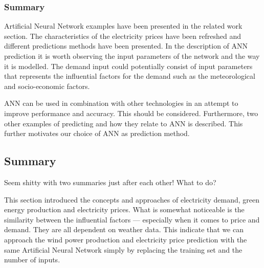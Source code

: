 \subsubsection{Summary}
Artificial Neural Network examples have been presented in the related work section. The characteristics of the electricity prices have been refreshed and different predictions methods have been presented. 
In the description of ANN prediction it is worth observing the input parameters of the network and the way it is modelled. The demand input could potentially consist of input parameters that represents the influential factors for the demand such as the meteorological and socio-economic factors.

ANN can be used in combination with other technologies in an attempt to improve performance and accuracy. This should be considered.
Furthermore, two other examples of predicting and how they relate to ANN is described. This further motivates our choice of ANN as prediction method.   

\subsection{Summary}
Seem shitty with two summaries just after each other! What to do?

This section introduced the concepts and approaches of electricity demand, green energy production and electricity prices. What is somewhat noticeable is the similarity between the influential factors --- especially when it comes to price and demand. They are all dependent on weather data. This indicate that we can approach the wind power production and electricity price prediction with the same Artificial Neural Network simply by replacing the training set and the number of inputs.